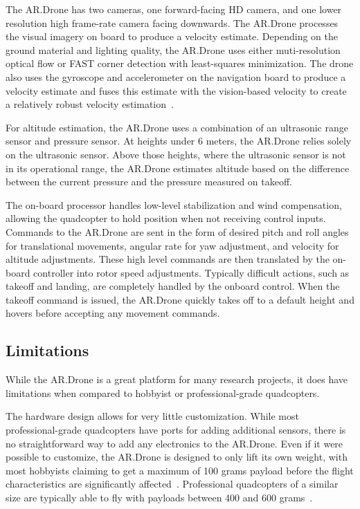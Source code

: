         The AR.Drone has two cameras, one forward-facing HD camera, and one lower resolution high frame-rate camera facing downwards. The AR.Drone processes the visual imagery on board to produce a velocity estimate. Depending on the ground material and lighting quality, the AR.Drone uses either muti-resolution optical flow or FAST corner detection with least-squares minimization. The drone also uses the gyroscope and accelerometer on the navigation board to produce a velocity estimate and fuses this estimate with the vision-based velocity to create a relatively robust velocity estimation~\cite{Bristeau}. %

        For altitude estimation, the AR.Drone uses a combination of an ultrasonic range sensor and pressure sensor. At heights under 6 meters, the AR.Drone relies solely on the ultrasonic sensor. Above those heights, where the ultrasonic sensor is not in its operational range, the AR.Drone estimates altitude based on the difference between the current pressure and the pressure measured on takeoff. 

        The on-board processor handles low-level stabilization and wind compensation, allowing the quadcopter to hold position when not receiving control inputs. Commands to the AR.Drone are sent in the form of desired pitch and roll angles for translational movements, angular rate for yaw adjustment, and velocity for altitude adjustments. These high level commands are then translated by the on-board controller into rotor speed adjustments. Typically difficult actions, such as takeoff and landing, are completely handled by the onboard control. When the takeoff command is issued, the AR.Drone quickly takes off to a default height and hovers before accepting any movement commands.

    \subsection{Limitations}

        While the AR.Drone is a great platform for many research projects, it does have limitations when compared to hobbyist or professional-grade quadcopters.

        The hardware design allows for very little customization. While most professional-grade quadcopters have ports for adding additional sensors, there is no straightforward way to add any electronics to the AR.Drone. Even if it were possible to customize, the AR.Drone is designed to only lift its own weight, with most hobbyists claiming to get a maximum of 100 grams payload before the flight characteristics are significantly affected~\cite{Forums}. Professional quadcopters of a similar size are typically able to fly with payloads between 400 and 600 grams~\cite{Mikrocopter}.

